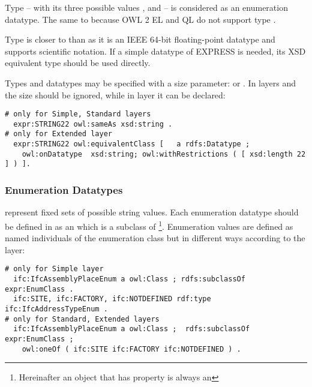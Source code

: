 Type  -- with its three possible values ,  and  -- is considered as an enumeration data\-type. The same to  because OWL 2 EL and QL do not support type  \cite{motik2012owl}.

Type  is closer to  than  as it is an IEEE 64-bit floating-point data\-type and supports scientific notation. If a simple datatype of EXPRESS is needed, its XSD equivalent type should be used directly.

Types  and  data\-types may be specified with a size parameter:  or . In layers \simple{} and \standard{} the size should be ignored, while in layer \extended{} it can be declared:

\begin{lstlisting}
# only for Simple, Standard layers
  expr:STRING22 owl:sameAs xsd:string .
# only for Extended layer
  expr:STRING22 owl:equivalentClass [   a rdfs:Datatype ;
    owl:onDatatype  xsd:string; owl:withRestrictions ( [ xsd:length 22 ] ) ].
\end{lstlisting}


\subsubsection{Enumeration Datatypes} represent fixed sets of possible string values. Each enumeration data\-type should be defined in \ifcowl{} as an  which is a subclass of \footnote{Hereinafter an object that has property  is always an }. Enumeration values are defined as named individuals of the enumeration class but in different ways according to the layer:

\begin{lstlisting}
# only for Simple layer
  ifc:IfcAssemblyPlaceEnum a owl:Class ; rdfs:subclassOf expr:EnumClass .
  ifc:SITE, ifc:FACTORY, ifc:NOTDEFINED rdf:type ifc:IfcAddressTypeEnum .
# only for Standard, Extended layers
  ifc:IfcAssemblyPlaceEnum a owl:Class ;  rdfs:subclassOf expr:EnumClass ;
    owl:oneOf ( ifc:SITE ifc:FACTORY ifc:NOTDEFINED ) .
\end{lstlisting}

